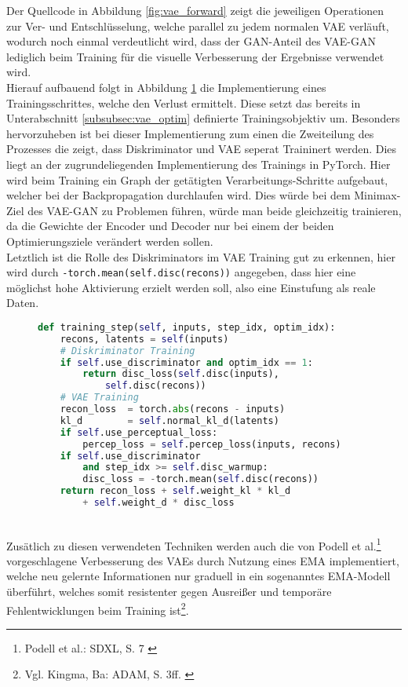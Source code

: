 Der Quellcode in Abbildung \ref{fig:vae_forward} zeigt die jeweiligen Operationen zur Ver- und Entschlüsselung, welche parallel zu jedem normalen \ac{VAE} verläuft, wodurch noch einmal verdeutlicht wird, dass der \ac{GAN}-Anteil des VAE-GAN lediglich beim Training für die visuelle Verbesserung der Ergebnisse verwendet wird. \\
Hierauf aufbauend folgt in Abbildung \ref{fig:vae_training} die Implementierung eines Trainingsschrittes, welche den Verlust ermittelt. Diese setzt das bereits in Unterabschnitt \ref{subsubsec:vae_optim} definierte Trainingsobjektiv um. Besonders hervorzuheben ist bei dieser Implementierung zum einen die Zweiteilung des Prozesses die zeigt, dass Diskriminator und \ac{VAE} seperat Traininert werden. Dies liegt an der zugrundeliegenden Implementierung des Trainings in PyTorch. Hier wird beim Training ein Graph der getätigten Verarbeitungs-Schritte aufgebaut, welcher bei der Backpropagation durchlaufen wird. Dies würde bei dem Minimax-Ziel des VAE-GAN zu Problemen führen, würde man beide gleichzeitig trainieren, da die Gewichte der Encoder und Decoder nur bei einem der beiden Optimierungsziele verändert werden sollen. \\
Letztlich ist die Rolle des Diskriminators im \ac{VAE} Training gut zu erkennen, hier wird durch \texttt{-torch.mean(self.disc(recons))} angegeben, dass hier eine möglichst hohe Aktivierung erzielt werden soll, also eine Einstufung als reale Daten. 
\begin{figure}[htbp]
\begin{lstlisting}[language=python]
def training_step(self, inputs, step_idx, optim_idx):
    recons, latents = self(inputs)
    # Diskriminator Training 
    if self.use_discriminator and optim_idx == 1:
        return disc_loss(self.disc(inputs), 
            self.disc(recons))
    # VAE Training
    recon_loss  = torch.abs(recons - inputs)
    kl_d        = self.normal_kl_d(latents)      
    if self.use_perceptual_loss:   
        percep_loss = self.percep_loss(inputs, recons)
    if self.use_discriminator 
        and step_idx >= self.disc_warmup:    
        disc_loss = -torch.mean(self.disc(recons))
    return recon_loss + self.weight_kl * kl_d 
        + self.weight_d * disc_loss 
\end{lstlisting}
    \captionsetup{type=figure}
    \label{fig:vae_training}
\end{figure} \\
Zusätlich zu diesen verwendeten Techniken werden auch die von Podell et al.\footnote{
    Podell et al.: SDXL, S. 7 
    \cite{podell2023sdxlimprovinglatentdiffusion}
} vorgeschlagene Verbesserung des \ac{VAE}s durch Nutzung eines \ac{EMA} implementiert, welche neu gelernte Informationen nur graduell in ein sogenanntes \ac{EMA}-Modell überführt, welches somit resistenter gegen Ausreißer und temporäre Fehlentwicklungen beim Training ist\footnote{
    Vgl. Kingma, Ba: ADAM, S. 3ff. 
    \cite{kingma2017adammethodstochasticoptimization}
}. 


